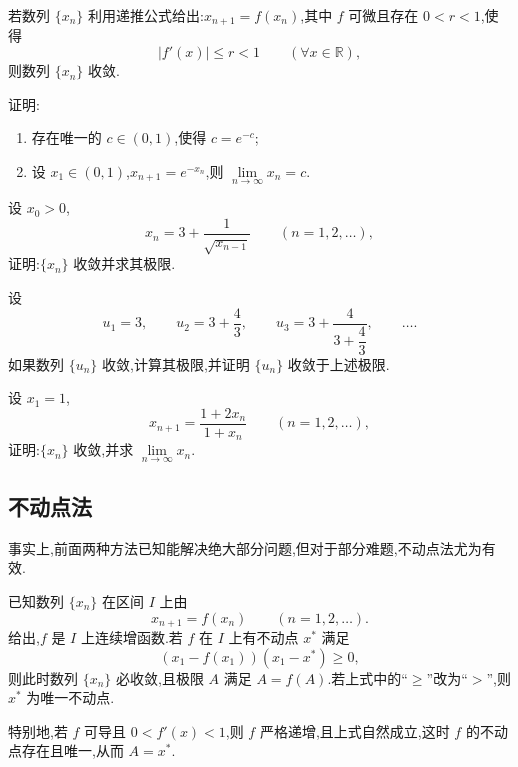 \documentclass[../数学分析培优讲义.tex]{subfiles}
\begin{document}
\begin{corollary}[\markstar]
若数列 $\{x_n\}$ 利用递推公式给出:$x_{n+1}=f(x_n)$,其中 $f$ 可微且存在 $0<r<1$,使得
\[
|f'(x)|\leq r<1\qquad(\forall x\in\mathbb R),
\]
则数列 $\{x_n\}$ 收敛.
\end{corollary}

\begin{example}
证明:
\begin{enumerate}[label=(\arabic*)]
  \item 存在唯一的 $c\in(0,1)$,使得 $c=e^{-c}$;
  \item 设 $x_1\in(0,1)$,$x_{n+1}=e^{-x_n}$,则
  $\displaystyle \lim\limits_{n\to\infty}x_n=c$.
\end{enumerate}
\end{example}
\exampleblank

\begin{example}
设 $x_0>0$,
\[
x_n=3+\dfrac{1}{\sqrt{x_{n-1}}}\qquad(n=1,2,\ldots),
\]
证明:$\{x_n\}$ 收敛并求其极限.
\end{example}
\exampleblank

\begin{example}
设
\[
u_1=3,
\qquad
u_2=3+\dfrac{4}{3},
\qquad
u_3=3+\dfrac{4}{3+\dfrac{4}{3}},
\qquad\ldots.
\]
如果数列 $\{u_n\}$ 收敛,计算其极限,并证明 $\{u_n\}$ 收敛于上述极限.
\end{example}
\exampleblank

\begin{example}
设 $x_1=1$,
\[
x_{n+1}=\dfrac{1+2x_n}{1+x_n}\qquad(n=1,2,\ldots),
\]
证明:$\{x_n\}$ 收敛,并求 $\displaystyle \lim\limits_{n\to\infty}x_n$.
\end{example}
\exampleblank


\newpage

\subsection{不动点法}

事实上,前面两种方法已知能解决绝大部分问题,但对于部分难题,不动点法尤为有效.

\begin{proposition}[\markstar]
已知数列 $\{x_n\}$ 在区间 $I$ 上由
\[
x_{n+1}=f(x_n)\qquad(n=1,2,\ldots).
\]
给出,$f$ 是 $I$ 上连续增函数.若 $f$ 在 $I$ 上有不动点 $x^*$ 满足
\[
(x_1-f(x_1))(x_1-x^*)\geq0,
\]
则此时数列 $\{x_n\}$ 必收敛,且极限 $A$ 满足 $A=f(A)$.若上式中的``$\geq$''改为``$>$'',则 $x^*$ 为唯一不动点.

特别地,若 $f$ 可导且 $0<f'(x)<1$,则 $f$ 严格递增,且上式自然成立,这时 $f$ 的不动点存在且唯一,从而 $A=x^*$.
\end{proposition}
\end{document}
